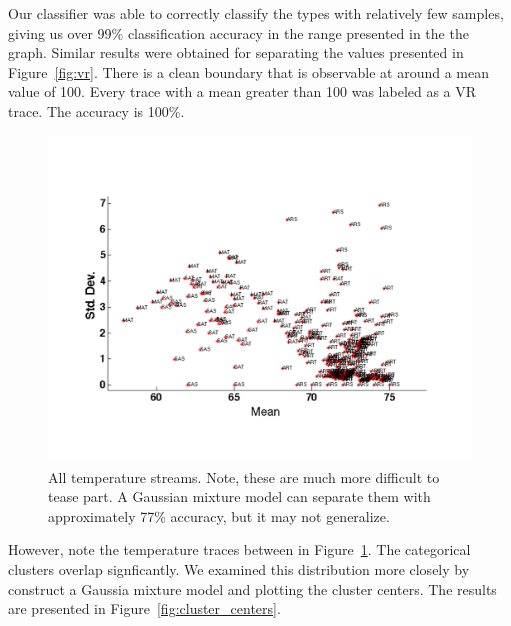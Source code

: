 
Our classifier was able to correctly classify the types with relatively few samples, giving us over 99\% classification accuracy in
the range presented in the the graph.  Similar results were obtained for separating the values presented in Figure~\ref{fig:vr}.
There is a clean boundary that is observable at around a mean value of 100.  Every trace with a mean greater than 100 was labeled as a VR
trace.  The accuracy is 100\%.

\begin{figure}[t!] %
\centering
\includegraphics[width=0.8\columnwidth]{figs/temperature_streams}
\caption{All temperature streams.  Note, these are much more difficult to tease part.  A Gaussian mixture model can
separate them with approximately 77\% accuracy, but it may not generalize.}
\label{fig:temps}
\end{figure}

However, note the temperature traces between in Figure~\ref{fig:temps}.  The categorical clusters overlap signficantly.  We 
examined this distribution more closely by construct a Gaussia mixture model and plotting the cluster centers.  The results
are presented in Figure~\ref{fig:cluster_centers}.


